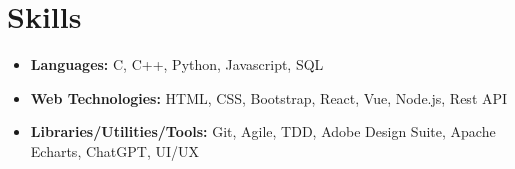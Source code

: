 \documentclass[10.8pt, a4paper]{extarticle}
\newcommand{\shorterSection}[1]{\vspace{-10pt}\section{#1}}
\begin{document}

\shorterSection{Skills}
\vspace{-2pt}
\begin{itemize}
    \item \textbf{Languages:} C, C++, Python, Javascript, SQL
    \item \textbf{Web Technologies:} HTML, CSS, Bootstrap, React, Vue, Node.js, Rest API
    \item \textbf{Libraries/Utilities/Tools:}  Git, Agile, TDD, Adobe Design Suite, Apache Echarts, ChatGPT, UI/UX
\end{itemize}
\vspace{0.055cm}
\end{document}
